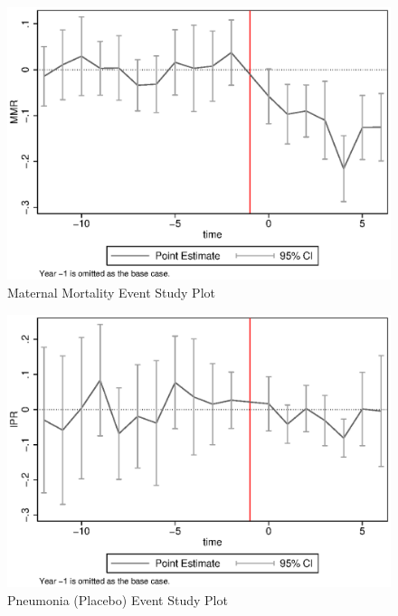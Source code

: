 \documentclass[legno]{beamer}
\begin{document}
\begin{frame}
\begin{figure}
\caption{Maternal Mortality Event Study Plot}
\includegraphics[scale=0.8]{./figures/eventMMR.eps}
\end{figure}
\end{frame}

\begin{frame}
\begin{figure}
\caption{Pneumonia (Placebo) Event Study Plot}
\includegraphics[scale=0.8]{./figures/eventIPR.eps}
\end{figure}
\end{frame}
\end{document}
